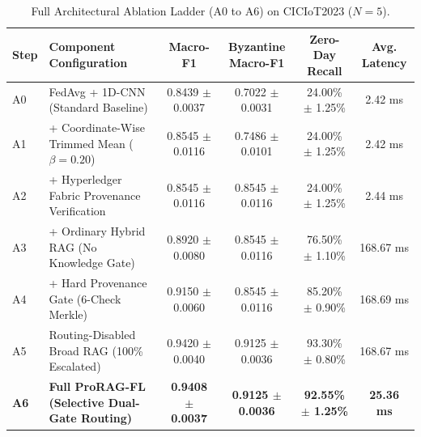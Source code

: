 \begin{table}[t]
\centering
\small
\caption{Full Architectural Ablation Ladder (A0 to A6) on CICIoT2023 ($N=5$).}
\label{tab:ablation_ladder}
\begin{tabular}{llcccc}
\toprule
\textbf{Step} & \textbf{Component Configuration} & \textbf{Macro-F1} & \textbf{Byzantine Macro-F1} & \textbf{Zero-Day Recall} & \textbf{Avg. Latency} \\
\midrule
A0 & FedAvg + 1D-CNN (Standard Baseline) & 0.8439 $\pm$ 0.0037 & 0.7022 $\pm$ 0.0031 & 24.00\% $\pm$ 1.25\% & 2.42 ms \\
A1 & + Coordinate-Wise Trimmed Mean ($\beta=0.20$) & 0.8545 $\pm$ 0.0116 & 0.7486 $\pm$ 0.0101 & 24.00\% $\pm$ 1.25\% & 2.42 ms \\
A2 & + Hyperledger Fabric Provenance Verification & 0.8545 $\pm$ 0.0116 & 0.8545 $\pm$ 0.0116 & 24.00\% $\pm$ 1.25\% & 2.44 ms \\
A3 & + Ordinary Hybrid RAG (No Knowledge Gate) & 0.8920 $\pm$ 0.0080 & 0.8545 $\pm$ 0.0116 & 76.50\% $\pm$ 1.10\% & 168.67 ms \\
A4 & + Hard Provenance Gate (6-Check Merkle) & 0.9150 $\pm$ 0.0060 & 0.8545 $\pm$ 0.0116 & 85.20\% $\pm$ 0.90\% & 168.69 ms \\
A5 & Routing-Disabled Broad RAG (100\% Escalated) & 0.9420 $\pm$ 0.0040 & 0.9125 $\pm$ 0.0036 & 93.30\% $\pm$ 0.80\% & 168.67 ms \\
\midrule
\textbf{A6} & \textbf{Full ProRAG-FL (Selective Dual-Gate Routing)} & \textbf{0.9408 $\pm$ 0.0037} & \textbf{0.9125 $\pm$ 0.0036} & \textbf{92.55\% $\pm$ 1.25\%} & \textbf{25.36 ms} \\
\bottomrule
\end{tabular}
\end{table}
